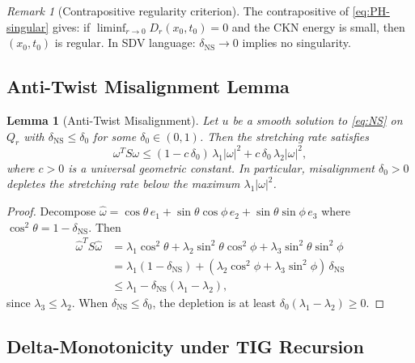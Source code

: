\documentclass[11pt]{article}
\newtheorem{lemma}[theorem]{Lemma}
\theoremstyle{definition}
\theoremstyle{remark}
\newtheorem{remark}[theorem]{Remark}
\begin{document}
\begin{remark}[Contrapositive regularity criterion]
The contrapositive of \eqref{eq:PH-singular} gives: if
$\liminf_{r\to 0} D_r(x_0,t_0) = 0$ and the CKN energy is small, then $(x_0, t_0)$
is regular.  In SDV language: $\delta_{\mathrm{NS}} \to 0$ implies no singularity.
\end{remark}

\subsection{Anti-Twist Misalignment Lemma}

\begin{lemma}[Anti-Twist Misalignment]
\label{lem:anti-twist}
Let $u$ be a smooth solution to \eqref{eq:NS} on $Q_r$ with
$\delta_{\mathrm{NS}} \leq \delta_0$ for some $\delta_0 \in (0,1)$.  Then the
stretching rate satisfies
\begin{equation}\label{eq:anti-twist}
  \omega^T S\omega \leq (1 - c\,\delta_0)\, \lambda_1 |\omega|^2
  + c\,\delta_0\, \lambda_2 |\omega|^2,
\end{equation}
where $c > 0$ is a universal geometric constant.  In particular, misalignment
$\delta_0 > 0$ depletes the stretching rate below the maximum $\lambda_1|\omega|^2$.
\end{lemma}

\begin{proof}
Decompose $\hat\omega = \cos\theta\, e_1 + \sin\theta\cos\phi\, e_2
+ \sin\theta\sin\phi\, e_3$ where $\cos^2\theta = 1 - \delta_{\mathrm{NS}}$.
Then
\begin{align*}
  \hat\omega^T S \hat\omega
  &= \lambda_1\cos^2\theta + \lambda_2\sin^2\theta\cos^2\phi
    + \lambda_3\sin^2\theta\sin^2\phi \\
  &= \lambda_1(1-\delta_{\mathrm{NS}})
    + (\lambda_2\cos^2\phi + \lambda_3\sin^2\phi)\,\delta_{\mathrm{NS}} \\
  &\leq \lambda_1 - \delta_{\mathrm{NS}}(\lambda_1 - \lambda_2),
\end{align*}
since $\lambda_3 \leq \lambda_2$.  When $\delta_{\mathrm{NS}} \leq \delta_0$,
the depletion is at least $\delta_0(\lambda_1 - \lambda_2) \geq 0$.
\end{proof}

\subsection{Delta-Monotonicity under TIG Recursion}
\end{document}
